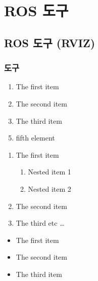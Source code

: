 
\chapter{ROS 도구}

\section{ROS 도구 (RVIZ)}

\subsection{도구}


\begin{enumerate}
\item The first item
\item The second item
\item The third item
\end{enumerate}

\begin{enumerate}
  \setcounter{enumi}{4}
  \item fifth element
\end{enumerate}

\begin{enumerate}
  \item The first item
  \begin{enumerate}
    \item Nested item 1
    \item Nested item 2
  \end{enumerate}
  \item The second item
  \item The third etc \ldots
\end{enumerate}


\begin{itemize}[leftmargin=*]
\item The first item
\item The second item
\item The third item
\end{itemize}

